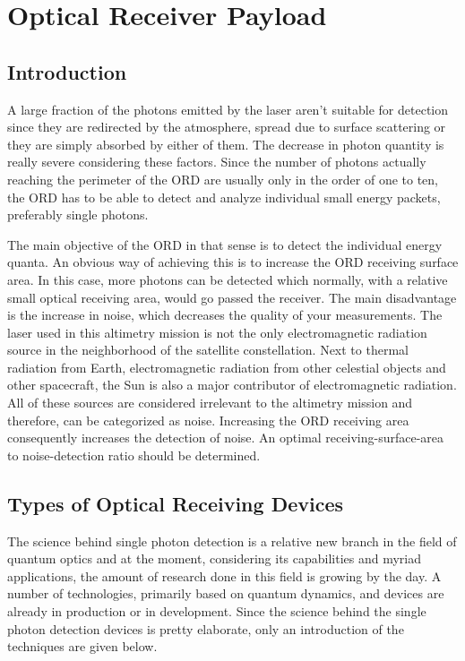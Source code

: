 \section{Optical Receiver Payload}
	\label{blDOreceiver}
		\subsection{Introduction}
A large fraction of the photons emitted by the \acs{laser} aren't suitable for detection since they are redirected by the atmosphere, spread due to surface scattering or they are simply absorbed by either of them. The decrease in photon quantity is really severe considering these factors. Since the number of photons actually reaching the perimeter of the \ac{ORD} are usually only in the order of one to ten, the \acs{ORD} has to be able to detect and analyze individual small energy packets, preferably single photons. 

The main objective of the \acs{ORD} in that sense is to detect the individual energy quanta. An obvious way of achieving this is to increase the \acs{ORD} receiving surface area. In this case, more photons can be detected which normally, with a relative small optical receiving area, would go passed the receiver. The main disadvantage is the increase in noise, which decreases the quality of your measurements. The \acs{laser} used in this altimetry mission is not the only electromagnetic radiation source in the neighborhood of the satellite constellation. Next to thermal radiation from Earth, electromagnetic radiation from other celestial objects and other spacecraft, the Sun is also a major contributor of electromagnetic radiation. All of these sources are considered irrelevant to the altimetry mission and therefore, can be categorized as noise. Increasing the \acs{ORD} receiving area consequently increases the detection of noise. An optimal receiving-surface-area to noise-detection ratio should be determined.

\subsection{Types of Optical Receiving Devices}
	\label{blDOtypesORD}
The science behind single photon detection is a relative new branch in the field of quantum optics and at the moment, considering its capabilities and myriad applications, the amount of research done in this field is growing by the day. A number of technologies, primarily based on quantum dynamics, and devices are already in production or in development. Since the science behind the single photon detection devices is pretty elaborate, only an introduction of the techniques are given below.

